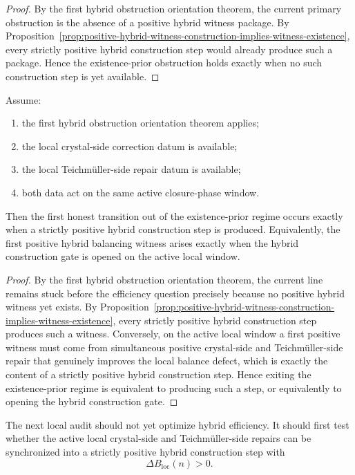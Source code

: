 \begin{proof}
By the first hybrid obstruction orientation theorem, the current primary obstruction is the absence of a positive hybrid witness package.
By Proposition~\ref{prop:positive-hybrid-witness-construction-implies-witness-existence}, every strictly positive hybrid construction step would already produce such a package.
Hence the existence-prior obstruction holds exactly when no such construction step is yet available.
\end{proof}

\begin{theorem}
\label{thm:first-positive-hybrid-witness-construction-theorem}
Assume:
\begin{enumerate}[leftmargin=2em,label=(\alph*)]
 \item the first hybrid obstruction orientation theorem applies;
 \item the local crystal-side correction datum is available;
 \item the local Teichm\"uller-side repair datum is available;
 \item both data act on the same active closure-phase window.
\end{enumerate}
Then the first honest transition out of the existence-prior regime occurs exactly when a strictly positive hybrid construction step is produced.
Equivalently, the first positive hybrid balancing witness arises exactly when the hybrid construction gate is opened on the active local window.
\end{theorem}

\begin{proof}
By the first hybrid obstruction orientation theorem, the current line remains stuck before the efficiency question precisely because no positive hybrid witness yet exists.
By Proposition~\ref{prop:positive-hybrid-witness-construction-implies-witness-existence}, every strictly positive hybrid construction step produces such a witness.
Conversely, on the active local window a first positive witness must come from simultaneous positive crystal-side and Teichm\"uller-side repair that genuinely improves the local balance defect, which is exactly the content of a strictly positive hybrid construction step.
Hence exiting the existence-prior regime is equivalent to producing such a step, or equivalently to opening the hybrid construction gate.
\end{proof}

\begin{corollary}
\label{cor:current-hybrid-construction-working-rule}
The next local audit should not yet optimize hybrid efficiency.
It should first test whether the active local crystal-side and Teichm\"uller-side repairs can be synchronized into a strictly positive hybrid construction step with
\[
 \Delta B_{\mathrm{loc}}(n)>0.
\]
\end{corollary}

